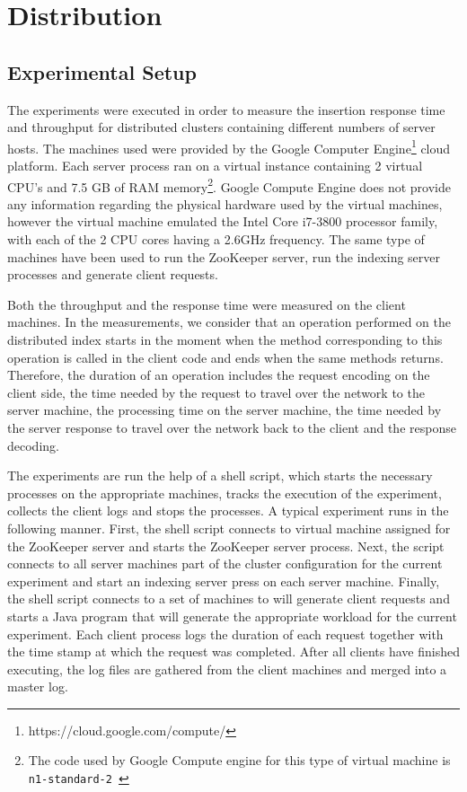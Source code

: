\documentclass[11pt,a4paper]{globis-book}
\begin{document}
\section{Distribution}
\label{sec:evalution-distribution}

\subsection{Experimental Setup}
The experiments were executed in order to measure the insertion response time and throughput for distributed clusters containing different numbers of server hosts. The machines used were provided by the Google Computer Engine\footnote{https://cloud.google.com/compute/} cloud platform. Each server process ran on a virtual instance containing 2 virtual CPU's and 7.5 GB of RAM memory\footnote{The code used by Google Compute engine for this type of virtual machine is \texttt{n1-standard-2 }}. Google Compute Engine does not provide any information regarding the physical hardware used by the virtual machines, however the virtual machine emulated the Intel Core i7-3800 processor family, with each of the 2 CPU cores having a 2.6GHz frequency. The same type of machines have been used to run the ZooKeeper server, run the indexing server processes and generate client requests. 

Both the throughput and the response time were measured on the client machines. In the measurements, we consider that an operation performed on the distributed index starts in the moment when the method corresponding to this operation is called in the client code and ends when the same methods returns. Therefore, the duration of an operation includes the request encoding on the client side, the time needed by the request to travel over the network to the server machine, the processing time on the server machine, the time needed by the server response to travel over the network back to the client and the response decoding. 

The experiments are run the help of a shell script, which starts the necessary processes on the appropriate machines, tracks the execution of the experiment, collects the client logs and stops the processes. A typical experiment runs in the following manner. First, the shell script connects to virtual machine assigned for the ZooKeeper server and starts the ZooKeeper server process. Next, the script connects to all server machines part of the cluster configuration for the current experiment and start an indexing server press on each server machine. Finally, the shell script connects to a set of machines to will generate client requests and starts a Java program that will generate the appropriate workload for the current experiment. Each client process logs the duration of each request together with the time stamp at which the request was completed. After all clients have finished executing, the log files are gathered from the client machines and merged into a master log. 
\end{document}
